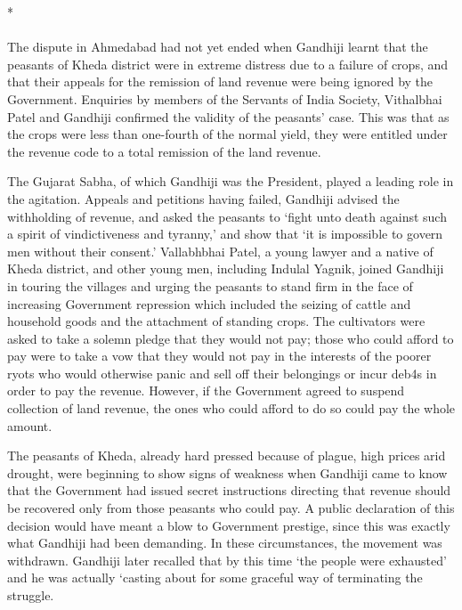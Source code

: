 \begin{multicols}{2}
\begin{center}*\end{center}

\paragraph*{}

The dispute in Ahmedabad had not yet ended when Gandhiji learnt that the peasants of Kheda district were in extreme distress due to a failure of crops, and that their appeals for the remission of land revenue were being ignored by the Government. Enquiries by members of the Servants of India Society, Vithalbhai Patel and Gandhiji confirmed the validity of the peasants' case. This was that as the crops were less than one-fourth of the normal yield, they were entitled under the revenue code to a total remission of the land revenue.

The Gujarat Sabha, of which Gandhiji was the President, played a leading role in the agitation. Appeals and petitions having failed, Gandhiji advised the withholding of revenue, and asked the peasants to `fight unto death against such a spirit of vindictiveness and tyranny,' and show that `it is impossible to govern men without their consent.' Vallabhbhai Patel, a young lawyer and a native of Kheda district, and other young men, including Indulal Yagnik, joined Gandhiji in touring the villages and urging the peasants to stand firm in the face of increasing Government repression which included the seizing of cattle and household goods and the attachment of standing crops. The cultivators were asked to take a solemn pledge that they would not pay; those who could afford to pay were to take a vow that they would not pay in the interests of the poorer ryots who would otherwise panic and sell off their belongings or incur deb4s in order to pay the revenue. However, if the Government agreed to suspend collection of land revenue, the ones who could afford to do so could pay the whole amount.

The peasants of Kheda, already hard pressed because of plague, high prices arid drought, were beginning to show signs of weakness when Gandhiji came to know that the Government had issued secret instructions directing that revenue should be recovered only from those peasants who could pay. A public declaration of this decision would have meant a blow to Government prestige, since this was exactly what Gandhiji had been demanding. In these circumstances, the movement was withdrawn. Gandhiji later recalled that by this time `the people were exhausted' and he was actually `casting about for some graceful way of terminating the struggle.


\end{multicols}

